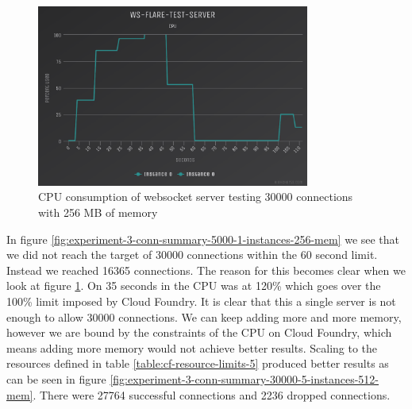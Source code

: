 \begin{figure}[H]
  \centering
    \includegraphics[width=0.8\textwidth]{figures/experiments/experiment-1/node-js/cpu-30000-256-memory.png}
    \caption{CPU consumption of websocket server testing 30000 connections with 256 MB of memory}
    \label{fig:experiment-3-cpu-5000-1-instances-256-mem}
\end{figure}

In figure \ref{fig:experiment-3-conn-summary-5000-1-instances-256-mem} we see that we did not reach the target of 30000 connections within the 60 second limit. Instead we reached 16365 connections. The reason for this becomes clear when we look at figure  \ref{fig:experiment-3-cpu-5000-1-instances-256-mem}. On 35 seconds in the CPU was at 120\% which goes over the 100\% limit imposed by Cloud Foundry. It is clear that this a single server is not enough to allow 30000 connections. We can keep adding more and more memory, however we are bound by the constraints of the CPU on Cloud Foundry, which means adding more memory would not achieve better results. Scaling to the resources defined in table \ref{table:cf-resource-limits-5} produced better results as can be seen in figure \ref{fig:experiment-3-conn-summary-30000-5-instances-512-mem}. There were 27764 successful connections and 2236 dropped connections.

\begin{table}[H]
\caption{Cloud Foundry Resource Limits}
\label{table:cf-resource-limits-5}
\end{table}

